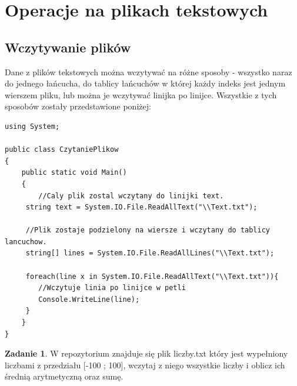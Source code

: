 \documentclass[a4paper]{article}
\theoremstyle{definition}
\newtheorem{zadanie}[theorem]{Zadanie}
\begin{document}
\section{Operacje na plikach tekstowych}
\subsection{Wczytywanie plików}
Dane z plików tekstowych można wczytywać na różne sposoby - wszystko naraz do jednego łańcucha, do tablicy łańcuchów w której każdy indeks jest jednym wierszem pliku, lub można je wczytywać linijka po linijce. Wszystkie z tych sposobów zostały przedstawione poniżej:\\ 
\begin{lstlisting}[frame=single]
using System;

public class CzytaniePlikow
{
    public static void Main()
    {
    	//Caly plik zostal wczytany do linijki text.
   	 string text = System.IO.File.ReadAllText("\\Text.txt");
   	 
   	 //Plik zostaje podzielony na wiersze i wczytany do tablicy lancuchow.
   	 string[] lines = System.IO.File.ReadAllLines("\\Text.txt");
   	 
   	 foreach(line x in System.IO.File.ReadAllText("\\Text.txt")){
   	 	//Wczytuje linia po linijce w petli
   	 	Console.WriteLine(line);
   	 }
    }
}
\end{lstlisting}
\begin{zadanie}
W repozytorium znajduje się plik liczby.txt który jest wypełniony liczbami z przedziału [-100 ; 100], wczytaj z niego wszystkie liczby i oblicz ich średnią arytmetyczną oraz sumę.
\end{zadanie}
\end{document}
